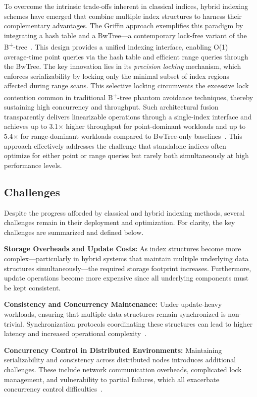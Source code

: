 \documentclass[sigconf]{acmart}
\begin{document}
To overcome the intrinsic trade-offs inherent in classical indices, hybrid indexing schemes have emerged that combine multiple index structures to harness their complementary advantages. The Griffin approach exemplifies this paradigm by integrating a hash table and a BwTree---a contemporary lock-free variant of the B\textsuperscript{+}-tree~\cite{ref35}. This design provides a unified indexing interface, enabling O(1) average-time point queries via the hash table and efficient range queries through the BwTree. The key innovation lies in its \emph{precision locking} mechanism, which enforces serializability by locking only the minimal subset of index regions affected during range scans. This selective locking circumvents the excessive lock contention common in traditional B\textsuperscript{+}-tree phantom avoidance techniques, thereby sustaining high concurrency and throughput. Such architectural fusion transparently delivers linearizable operations through a single-index interface and achieves up to 3.1$\times$ higher throughput for point-dominant workloads and up to 5.4$\times$ for range-dominant workloads compared to BwTree-only baselines~\cite{ref35}. This approach effectively addresses the challenge that standalone indices often optimize for either point or range queries but rarely both simultaneously at high performance levels.

\subsection{Challenges}

Despite the progress afforded by classical and hybrid indexing methods, several challenges remain in their deployment and optimization. For clarity, the key challenges are summarized and defined below.

\textbf{Storage Overheads and Update Costs:} As index structures become more complex—particularly in hybrid systems that maintain multiple underlying data structures simultaneously—the required storage footprint increases. Furthermore, update operations become more expensive since all underlying components must be kept consistent.

\textbf{Consistency and Concurrency Maintenance:} Under update-heavy workloads, ensuring that multiple data structures remain synchronized is non-trivial. Synchronization protocols coordinating these structures can lead to higher latency and increased operational complexity~\cite{ref31,ref35}.

\textbf{Concurrency Control in Distributed Environments:} Maintaining serializability and consistency across distributed nodes introduces additional challenges. These include network communication overheads, complicated lock management, and vulnerability to partial failures, which all exacerbate concurrency control difficulties~\cite{ref31}.
\end{document}
